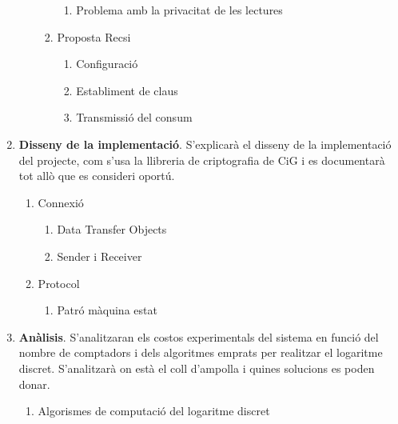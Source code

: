 \documentclass{article}
\begin{document}
\begin{enumerate}
\begin{enumerate}
\begin{enumerate}
\begin{enumerate}
					\item Problema amb la privacitat de les lectures
				\end{enumerate}
				\item Proposta Recsi
				\begin{enumerate}
					\item Configuració
					\item Establiment de claus
					\item Transmissió del consum
				\end{enumerate}
			\end{enumerate}
		\end{enumerate}
		\item \textbf{Disseny de la implementació}. S'explicarà el disseny de la implementació del projecte, com s'usa la llibreria de criptografia de CiG i es documentarà tot allò que es consideri oportú.
		\begin{enumerate}
			\item Connexió
			\begin{enumerate}
				\item Data Transfer Objects
				\item Sender i Receiver
			\end{enumerate}
			\item Protocol
			\begin{enumerate}
				\item Patró màquina estat
			\end{enumerate}
		\end{enumerate}
		\item \textbf{Anàlisis}. S'analitzaran els costos experimentals del sistema en funció del nombre de comptadors i dels algoritmes emprats per realitzar el logaritme discret. S'analitzarà on està el coll d'ampolla i quines solucions es poden donar.
		\begin{enumerate}
			\item Algorismes de computació del logaritme discret
		\end{enumerate}
	\end{enumerate}
\end{document}
